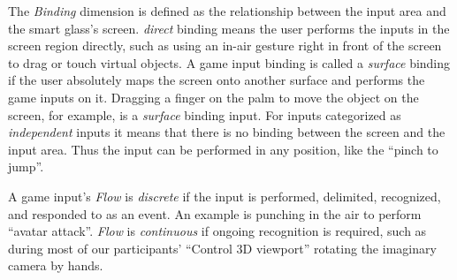 \documentclass{sigchi}
\begin{document}
The \emph{Binding} dimension is defined as the relationship between the input area and the smart glass's screen. \emph{direct} binding means the user performs the inputs in the screen region directly, such as using an in-air gesture right in front of the screen to drag or touch virtual objects. A game input binding is called a \emph{surface} binding if the user absolutely maps the screen onto another surface and performs the game inputs on it. Dragging a finger on the palm to move the object on the screen, for example, is a \emph{surface} binding input. For inputs categorized as \emph{independent} inputs it means that there is no binding between the screen and the input area. Thus the input can be performed in any position, like the ``pinch to jump''.

  A game input's \emph{Flow} is \emph{discrete} if the input is performed, delimited, recognized, and responded to as an event. An example is punching in the air to perform ``avatar attack''. \emph{Flow} is \emph{continuous} if ongoing recognition is required, such as during most of our participants' ``Control 3D viewport'' rotating the imaginary camera by hands. 
\end{document}
